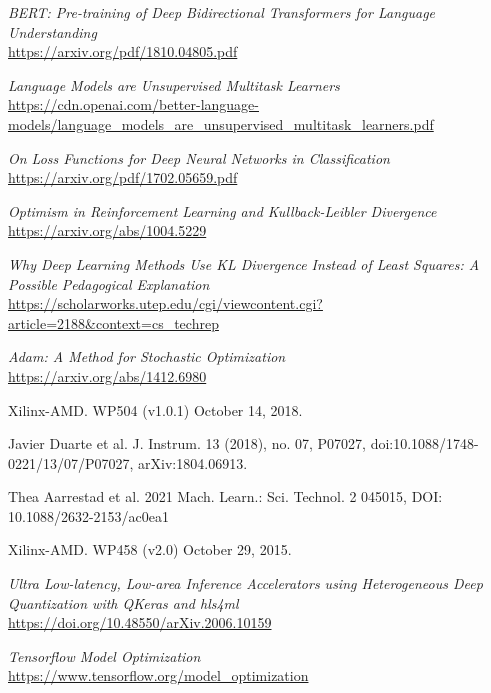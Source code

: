 \begin{thebibliography}{99}
\textit{BERT: Pre-training of Deep Bidirectional Transformers for
Language Understanding}
\\\url{https://arxiv.org/pdf/1810.04805.pdf}

\textit{Language Models are Unsupervised Multitask Learners}
\\\url{https://cdn.openai.com/better-language-models/language_models_are_unsupervised_multitask_learners.pdf}

\textit{On Loss Functions for Deep Neural Networks
in Classification}
\\\url{https://arxiv.org/pdf/1702.05659.pdf}

\textit{Optimism in Reinforcement Learning and Kullback-Leibler Divergence
}
\\\url{https://arxiv.org/abs/1004.5229}

\textit{Why Deep Learning Methods Use KL Divergence
Instead of Least Squares: A Possible Pedagogical
Explanation}
\\\url{https://scholarworks.utep.edu/cgi/viewcontent.cgi?article=2188&context=cs_techrep}

\textit{Adam: A Method for Stochastic Optimization}
\\\url{https://arxiv.org/abs/1412.6980}

Xilinx-AMD.
WP504 (v1.0.1) October 14, 2018.

Javier Duarte et al.
J. Instrum. 13 (2018),
no. 07, P07027, doi:10.1088/1748-0221/13/07/P07027, arXiv:1804.06913.

Thea Aarrestad et al.
2021 Mach. Learn.: Sci. Technol. 2 045015,
DOI: 10.1088/2632-2153/ac0ea1

Xilinx-AMD.
WP458 (v2.0) October 29, 2015.

\textit{Ultra Low-latency, Low-area Inference Accelerators using Heterogeneous Deep Quantization with QKeras and hls4ml}
\\\url{https://doi.org/10.48550/arXiv.2006.10159}

\textit{Tensorflow Model Optimization}
\\\url{https://www.tensorflow.org/model_optimization}


\end{thebibliography}
